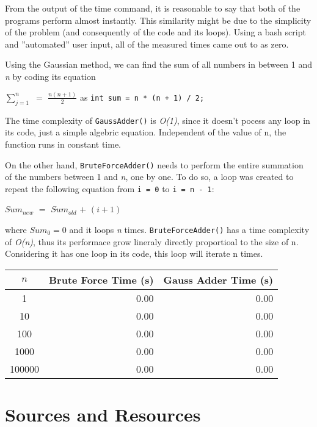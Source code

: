 \documentclass{article}
\begin{document}
From the output of the time command, it is reasonable to say that both of the programs perform almost instantly. This similarity might be due to the simplicity of the problem (and consequently of the code and its loops). Using a bash script and ''automated'' user input, all of the measured times came out to as zero.

Using the Gaussian method, we can find the sum of all numbers in between 1 and \textit{n} by coding its equation

\begin{center} $\sum_{j=1}^n$ $=$ $\frac{n(n + 1)}{2}$   as   \texttt{int sum = n * (n + 1) / 2;} \end{center}

The time complexity of \texttt{GaussAdder()} is \textit{O(1)}, since it doesn't pocess any loop in its code, just a simple algebric equation. Independent of the value of n, the function runs in constant time.

On the other hand, \texttt{BruteForceAdder()} needs to perform the entire summation of the numbers between 1 and \textit{n}, one by one. To do so, a loop was created to repeat the following equation from \texttt{i = 0} to \texttt{i = n - 1}:

\begin{center} $Sum_{new}$ $=$ $Sum_{old}$ $+$ $(i + 1)$ \end{center}

where $Sum_{0} = 0$ and it loops \textit{n} times. \texttt{BruteForceAdder()} has a time complexity of \textit{O(n)}, thus its performace grow lineraly directly proportioal to the size of n. Considering it has one loop in its code, this loop will iterate n times. 

\bigskip

\begin{center} \begin{tabular}{|c|r|r|}
\hline
$n$ & Brute Force Time (s) & Gauss Adder Time (s) \\
\hline
\hline
1 & 0.00 & 0.00\\ \hline
10 & 0.00 & 0.00\\ \hline
100 & 0.00 & 0.00\\ \hline
1000 & 0.00 & 0.00\\ \hline
100000 & 0.00 & 0.00\\ \hline
\end{tabular} \end{center}


\newpage

\section{Sources and Resources}
\end{document}

